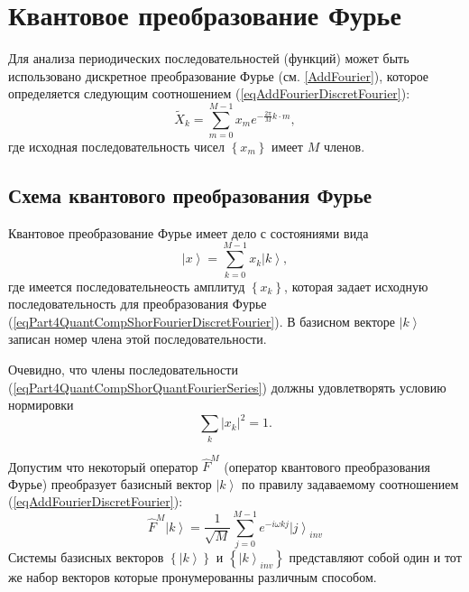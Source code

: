 \section{Квантовое преобразование Фурье}
Для анализа периодических последовательностей (функций) может быть
использовано дискретное преобразование Фурье
(см. \ref{AddFourier}), которое определяется следующим соотношением
(\ref{eqAddFourierDiscretFourier}):
\begin{equation}
\tilde{X}_k = \sum^{M - 1}_{m = 0} x_m e^{-\frac{2 \pi}{M} k\cdot m},
\label{eqPart4QuantCompShorFourierDiscretFourier}
\end{equation}
где исходная последовательность чисел $\left\{x_m\right\}$ имеет $M$
членов. 

\subsection{Схема квантового преобразования Фурье}
Квантовое преобразование Фурье имеет дело с состояниями вида
\begin{equation}
\left|x\right> = \sum_{k = 0}^{M - 1}x_k \left|k\right>,
\label{eqPart4QuantCompShorQuantFourierSeries}
\end{equation}
где имеется последовательнеость амплитуд $\left\{x_k\right\}$, которая
задает исходную последовательность для преобразования Фурье 
(\ref{eqPart4QuantCompShorFourierDiscretFourier}). В базисном векторе
$\left|k\right>$ записан номер члена этой последовательности.   

Очевидно, что члены последовательности
(\ref{eqPart4QuantCompShorQuantFourierSeries})  должны удовлетворять
условию нормировки 
\[
\sum_k\left|x_k\right|^2 = 1.
\]

Допустим что некоторый оператор $\hat{F}^{M}$ (оператор квантового
преобразования Фурье) преобразует базисный вектор $\left|k\right>$ по
правилу задаваемому соотношением (\ref{eqAddFourierDiscretFourier}):
\begin{equation}
\hat{F}^{M}\left|k\right> = \frac{1}{\sqrt{M}}\sum_{j = 0}^{M -1}
e^{-i \omega k j}\left|j\right>_{inv} 
\label{eqPart4QuantCompShorQuantFourierBasis}
\end{equation}
Системы базисных векторов $\left\{\left|k\right>\right\}$ и 
$\left\{\left|k\right>_{inv}\right\}$ представляют собой один и тот же
набор векторов которые пронумерованны различным способом.

